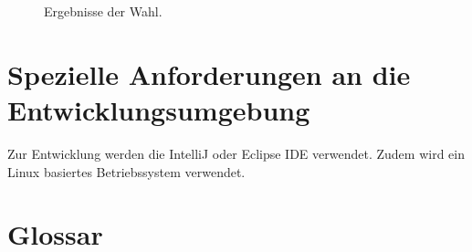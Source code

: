\documentclass[parskip=full,11pt,twoside]{scrartcl}
\begin{document}
\begin{figure}[hb]
	\caption{\label{fig:whlr-result}
		Ergebnisse der Wahl.
	}
\end{figure}

\section{Spezielle Anforderungen an die Entwicklungsumgebung}
Zur Entwicklung werden die IntelliJ oder Eclipse IDE verwendet.
Zudem wird ein \gls{Linux} basiertes Betriebssystem verwendet.

\section{Glossar}
\printglossaries
\end{document}
